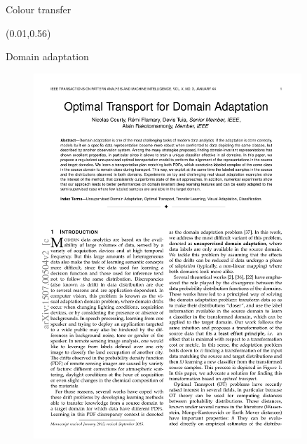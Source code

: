 \documentclass[pdf,aspectratio=169,10pt]{beamer}
\begin{document}
\begin{frame}[plain]{ Colour transfer}
\begin{textblock}{0.45}(0.01,0.56)
\small
{}
\end{textblock}
\end{frame}


\begin{frame}{  Domain  adaptation}

\begin{minipage}{0.49\textwidth}
\vspace{1em}
    \begin{figure}
        \includegraphics[trim={1.5cm 20.5cm 2cm 1.5cm},clip, page=2, width=0.9\textwidth]{../img/OT4DA}\hfill
    \end{figure}
\vspace{-0.5em}
    \begin{figure}

\end{figure}
\end{minipage}
\end{frame}
\end{document}

